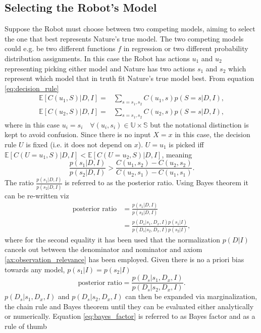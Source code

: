 	\subsection{Selecting the Robot's Model}
	\label{sec:model_selection}
	Suppose the Robot must choose between two competing models, aiming to select the one that best represents Nature's true model. The two competing models could e.g. be two different functions $f$ in regression or two different probability distribution assignments. In this case the Robot has actions $u_1$ and $u_2$ representing picking either model and Nature has two actions $s_1$ and $s_2$ which represent which model that in truth fit Nature's true model best. From equation \eqref{eq:decision_rule}
	\begin{equation}
		\begin{split}
			\mathbb{E}[C(u_1, S)|D,I] =&  \sum_{s = s_1,s_2}C(u_1,s)p(S=s|D,I),\\
			\mathbb{E}[C(u_2, S)|D,I] =&  \sum_{s = s_1,s_2}C(u_2,s)p(S=s|D,I),
		\end{split}
	\end{equation}
	where in this case $u_i=s_i\quad \forall (u_i,s_i)\in \mathbb{U}\times\mathbb{S}$ but the notational distinction is kept to avoid confusion. Since there is no input $X=x$ in this case, the decision rule $U$ is fixed (i.e. it does not depend on $x$). $U = u_1$ is picked iff $\mathbb{E}[C(U = u_1, S)|D,I]<\mathbb{E}[C(U = u_2, S)|D,I]$, meaning
	\begin{equation}
		\frac{p(s_1|D,I)}{p(s_2|D,I)}>\frac{C(u_1,s_2)-C(u_2,s_2)}{C(u_2,s_1)-C(u_1,s_1)}.
	\end{equation}
	The ratio $\frac{p(s_1|D,I)}{p(s_2|D,I)}$ is referred to as the posterior ratio. Using Bayes theorem it can be re-written viz
	\begin{equation}
		\begin{split}
			\text{posterior ratio} &= \frac{p(s_1|D,I)}{p(s_2|D,I)}\\
			& = \frac{p(D_s|s_1,D_x,I)p(s_1|I)}{p(D_s|s_2,D_x,I)p(s_2|I)},
		\end{split}
	\end{equation}
	where for the second equality it has been used that the normalization $p(D|I)$ cancels out between the denominator and nominator and axiom \ref{ax:observation_relevance} has been employed. Given there is no a priori bias towards any model, $p(s_1|I) = p(s_2|I)$
	\begin{equation}
		\text{posterior ratio} = \frac{p(D_s|s_1,D_x,I)}{p(D_s|s_2,D_x,I)}.
		\label{eq:bayes_factor}
	\end{equation}
	$p(D_s|s_1,D_x,I)$ and $p(D_s|s_2,D_x,I)$ can then be expanded via marginalization, the chain rule and Bayes theorem until they can be evaluated either analytically or numerically. Equation \eqref{eq:bayes_factor} is referred to as Bayes factor and as a rule of thumb
	
